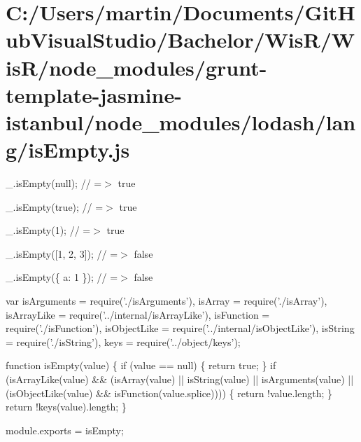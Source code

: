 \hypertarget{_c_1_2_users_2martin_2_documents_2_git_hub_visual_studio_2_bachelor_2_wis_r_2_wis_r_2node_moduleac24f845bd8a4a86f0bc2c34b8d71959}{}\section{C\+:/\+Users/martin/\+Documents/\+Git\+Hub\+Visual\+Studio/\+Bachelor/\+Wis\+R/\+Wis\+R/node\+\_\+modules/grunt-\/template-\/jasmine-\/istanbul/node\+\_\+modules/lodash/lang/is\+Empty.\+js}
\+\_\+.\+is\+Empty(null); // =$>$ true

\+\_\+.\+is\+Empty(true); // =$>$ true

\+\_\+.\+is\+Empty(1); // =$>$ true

\+\_\+.\+is\+Empty(\mbox{[}1, 2, 3\mbox{]}); // =$>$ false

\+\_\+.\+is\+Empty(\{ \textquotesingle{}a\textquotesingle{}\+: 1 \}); // =$>$ false


\begin{DoxyCodeInclude}
var isArguments = require(\textcolor{stringliteral}{'./isArguments'}),
    isArray = require(\textcolor{stringliteral}{'./isArray'}),
    isArrayLike = require(\textcolor{stringliteral}{'../internal/isArrayLike'}),
    isFunction = require(\textcolor{stringliteral}{'./isFunction'}),
    isObjectLike = require(\textcolor{stringliteral}{'../internal/isObjectLike'}),
    isString = require(\textcolor{stringliteral}{'./isString'}),
    keys = require(\textcolor{stringliteral}{'../object/keys'});

\textcolor{keyword}{function} isEmpty(value) \{
  \textcolor{keywordflow}{if} (value == null) \{
    \textcolor{keywordflow}{return} \textcolor{keyword}{true};
  \}
  \textcolor{keywordflow}{if} (isArrayLike(value) && (isArray(value) || isString(value) || isArguments(value) ||
      (isObjectLike(value) && isFunction(value.splice)))) \{
    \textcolor{keywordflow}{return} !value.length;
  \}
  \textcolor{keywordflow}{return} !keys(value).length;
\}

module.exports = isEmpty;
\end{DoxyCodeInclude}
 